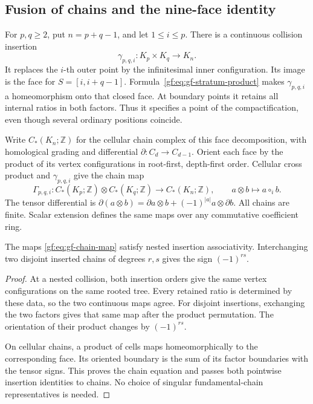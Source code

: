 \subsection{Fusion of chains and the nine-face identity}
\label{gf:sec:gf-chains}

For \(p,q\geq2\), put \(n=p+q-1\), and let \(1\leq i\leq p\).
There is a continuous collision insertion
\begin{equation}\label{gf:eq:gf-gamma}
 \gamma_{p,q,i}:K_p\times K_q\longrightarrow K_n.
\end{equation}
It replaces the \(i\)-th outer point by the infinitesimal inner
configuration.  Its image is the face for
\(S=[i,i+q-1]\).  Formula~\eqref{gf:eq:gf-stratum-product}
makes \(\gamma_{p,q,i}\) a homeomorphism onto that closed face.
At boundary points it retains all internal ratios in both factors.
Thus it specifies a point of the compactification, even though
several ordinary positions coincide.

Write \(C_*(K_n;\mathbb Z)\) for the cellular chain complex of
this face decomposition, with homological grading and differential
\(\partial:C_d\to C_{d-1}\).  Orient each face by the product
of its vertex configurations in root-first, depth-first order.
Cellular cross product and \(\gamma_{p,q,i}\) give the chain map
\begin{equation}\label{gf:eq:gf-chain-map}
 \Gamma_{p,q,i}:C_*(K_p;\mathbb Z)\otimes
 C_*(K_q;\mathbb Z)\longrightarrow C_*(K_n;\mathbb Z),
 \qquad a\otimes b\longmapsto a\circ_i b.
\end{equation}
The tensor differential is
\(\partial(a\otimes b)=\partial a\otimes b+(-1)^{|a|}a\otimes\partial b\).
All chains are finite.  Scalar extension defines the same maps
over any commutative coefficient ring.

\begin{lemma}\label{gf:lem:gf-grafting}
The maps \eqref{gf:eq:gf-chain-map} satisfy nested insertion
associativity.  Interchanging two disjoint inserted chains of
degrees \(r,s\) gives the sign \((-1)^{rs}\).
\end{lemma}

\begin{proof}
At a nested collision, both insertion orders give the same vertex
configurations on the same rooted tree.  Every retained ratio is
determined by these data, so the two continuous maps agree.
For disjoint insertions, exchanging the two factors gives that
same map after the product permutation.  The orientation of their
product changes by \((-1)^{rs}\).

On cellular chains, a product of cells maps homeomorphically to
the corresponding face.  Its oriented boundary is the sum of its
factor boundaries with the tensor signs.  This proves the chain
equation and passes both pointwise insertion identities to chains.
No choice of singular fundamental-chain representatives is needed.
\end{proof}

